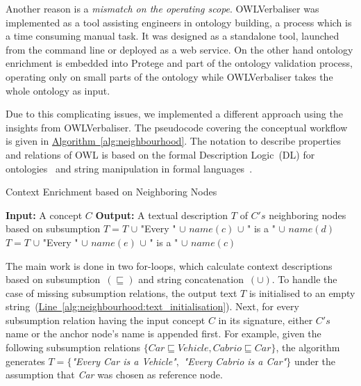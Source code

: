 \documentclass[draft,final]{vutinfth} %
\begin{document}
Another reason is a \emph{mismatch on the operating scope}. OWLVerbaliser was implemented as a tool assisting engineers in ontology building, a process which is a time consuming manual task. It was designed as a standalone tool, launched from the command line or deployed as a web service. On the other hand ontology enrichment is embedded into Protege and part of the ontology validation process, operating only on small parts of the ontology while OWLVerbaliser takes the whole ontology as input. 

Due to this complicating issues, we implemented a different approach using the insights from OWLVerbaliser. The pseudocode covering the conceptual workflow is given in \hyperref[alg:neighbourhood]{Algorithm~\ref*{alg:neighbourhood}}. The notation to describe properties and relations of OWL is based on the formal Description Logic~(DL) for ontologies~\cite{baader2003} and string manipulation in formal languages~\cite{hopcroft1969}.

\begin{algorithm}
	\caption{Context Enrichment based on Neighboring Nodes}\label{alg:neighbourhood}
	\begin{algorithmic}[1]
		\newline
			\textbf{Input:} A concept $C$\newline
			\textbf{Output:} A textual description $T$ of $C's$ neighboring nodes based on subsumption\newline
			 \label{alg:neighbourhood:text_initialisation}
				\State $T=T$ $\cup$ "Every " $\cup$ $name(c)$ $\cup$ " is a " $\cup$ $name(d)$
			\EndFor
				\State $T=T$ $\cup$ "Every " $\cup$ $name(e)$ $\cup$ " is a " $\cup$ $name(c)$
			\EndFor
		\EndProcedure
	\end{algorithmic}
\end{algorithm}

The main work is done in two for-loops, which calculate context descriptions based on subsumption~$(\sqsubseteq)$ and string concatenation~$(\cup)$. To handle the case of missing subsumption relations, the output text $T$ is initialised to an empty string~(\hyperref[alg:neighbourhood:text_initialisation]{Line~\ref*{alg:neighbourhood:text_initialisation}}). Next, for every subsumption relation having the input concept $C$ in its signature, either $C's$ name or the anchor node's name is appended first. For example, given the following subsumption relations $\{Car \sqsubseteq Vehicle, Cabrio \sqsubseteq Car\}$, the algorithm generates $T=\{$\textit{"Every Car is a Vehicle"}$,$ \textit{"Every Cabrio is a Car"}$\}$ under the assumption that \textit{Car} was chosen as reference node.  
\end{document}
